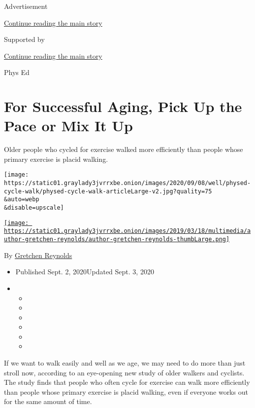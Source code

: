 Advertisement

\protect\hyperlink{after-top}{Continue reading the main story}

Supported by

\protect\hyperlink{after-sponsor}{Continue reading the main story}

Phys Ed

\hypertarget{for-successful-aging-pick-up-the-pace-or-mix-it-up}{%
\section{For Successful Aging, Pick Up the Pace or Mix It
Up}\label{for-successful-aging-pick-up-the-pace-or-mix-it-up}}

Older people who cycled for exercise walked more efficiently than people
whose primary exercise is placid walking.

\texttt{[image: https://static01.graylady3jvrrxbe.onion/images/2020/09/08/well/physed-cycle-walk/physed-cycle-walk-articleLarge-v2.jpg?quality=75\\\&auto=webp\\\&disable=upscale]}

\href{https://www.nytimes3xbfgragh.onion/by/gretchen-reynolds}{\texttt{[image: https://static01.graylady3jvrrxbe.onion/images/2019/03/18/multimedia/author-gretchen-reynolds/author-gretchen-reynolds-thumbLarge.png]}}

By
\href{https://www.nytimes3xbfgragh.onion/by/gretchen-reynolds}{Gretchen
Reynolds}

\begin{itemize}
\item
  Published Sept. 2, 2020Updated Sept. 3, 2020
\item
  \begin{itemize}
  \item
  \item
  \item
  \item
  \item
  \item
  \end{itemize}
\end{itemize}

If we want to walk easily and well as we age, we may need to do more
than just stroll now, according to an eye-opening new study of older
walkers and cyclists. The study finds that people who often cycle for
exercise can walk more efficiently than people whose primary exercise is
placid walking, even if everyone works out for the same amount of time.

